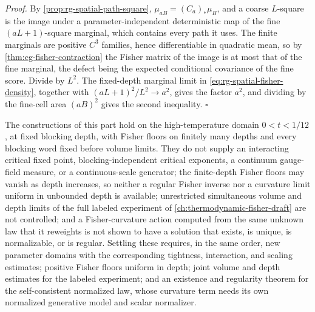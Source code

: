 \noindent\emph{Proof.}
By \cref{prop:rg-spatial-path-square}, \(\mu_{aB}=(C_a)_*\mu_B\), and a
coarse \(L\)-square is the image under a parameter-independent
deterministic map of the fine \((aL+1)\)-square marginal, which contains
every path it uses. The finite marginals are positive \(C^3\) families, hence
differentiable in quadratic mean, so by \cref{thm:cg-fisher-contraction}
the Fisher matrix of the image is at most that of the fine marginal, the
defect being the expected conditional covariance of the fine score. Divide by \(L^2\). The
fixed-depth marginal limit in \cref{eq:rg-spatial-fisher-density}, together
with \((aL+1)^2/L^2\to a^2\), gives the factor \(a^2\), and dividing by the
fine-cell area \((aB)^2\) gives the second inequality. \hfill\(\square\)

The constructions of this part hold on the high-temperature domain
\(0<t<1/12\), at fixed blocking depth, with Fisher floors on finitely many
depths and every blocking word fixed before volume limits. They do not
supply an interacting critical fixed point, blocking-independent critical
exponents, a continuum gauge-field measure, or a continuous-scale generator;
the finite-depth Fisher floors may vanish as depth increases, so neither a
regular Fisher inverse nor a curvature limit uniform in unbounded depth is
available; unrestricted simultaneous volume and depth limits of the full
labeled experiment of \cref{ch:thermodynamic-fisher-draft} are not
controlled; and a Fisher-curvature action computed from the same unknown
law that it reweights is not shown to have a solution that exists, is
unique, is normalizable, or is regular. Settling these requires, in the
same order, new parameter domains with the corresponding tightness,
interaction, and scaling estimates; positive Fisher floors uniform in
depth; joint volume and depth estimates for the labeled experiment; and an
existence and regularity theorem for the self-consistent normalized law,
whose curvature term needs its own normalized generative model and scalar
normalizer.
